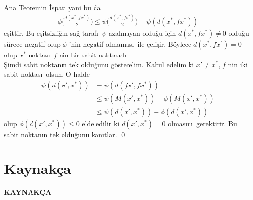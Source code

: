 \documentclass[8pt]{beamer}
\begin{document}
\begin{frame}
  \begin{block}{Ana Teoremin \.{I}spat\i }
    yani bu da
    \begin{align}
      \phi\bigg(\frac{d(x^*,fx^*)}{2}\bigg)  \leq \psi\bigg(\frac{d(x^*,fx^*)}{2}\bigg)-\psi(d(x^*,fx^*))
    \end{align}
e\c{s}ittir. Bu e\c{s}itsizli\u{g}in sa\u{g} taraf\i\ $\psi$ azalmayan oldu\u{g}u i\c{c}in $d(x^*,fx^*)\neq 0$ oldu\u{g}u s\"urece  negatif  olup $\phi$ 'nin negatif olmamas\i\ ile \c{c}eli\c{s}ir. B\"oylece $d(x^*,fx^*)=0$ olup $x^*$ noktas\i\ $f$ nin bir sabit noktas\i d\i r.\\
\vspace{10pt}
\hspace{5pt} \c{S}imdi sabit noktan\i n tek oldu\u{g}unu g\"osterelim. Kabul edelim ki $x'\neq x^*$, $f$ nin iki sabit noktas\i\ olsun. O halde 
   \begin{align}
     \psi(d(x',x^*))&=\psi(d(fx',fx^*))\\
      &\leq \psi(M(x',x^*))-\phi(M(x',x^*))\\
      & \leq \psi(d(x',x^*))-\phi(d(x',x^*))
   \end{align}
olup $\phi(d(x',x^*))\leq 0$ elde edilir ki $d(x',x^*)=0$ olmas\i n\i\ gerektirir. Bu sabit noktan\i n tek oldu\u{g}unu kan\i tlar. \qed
  \end{block}
\end{frame} %

\section{Kaynak\c{c}a}
  \textbf{KAYNAK\c{C}A}
  \vspace{10pt}  
   \nocite{*}
\end{document}

